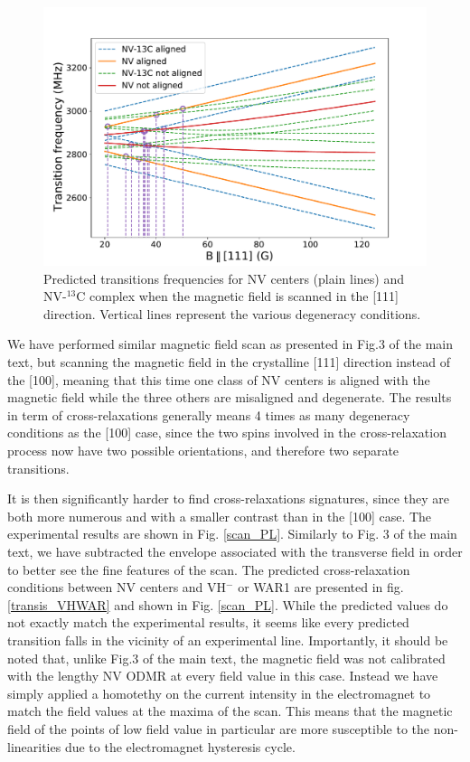 \documentclass[9pt,twocolumn,twoside]{revtex4-1}
\begin{document}
\begin{figure}

\includegraphics[width=\linewidth]{Transis_111_13C}
\caption{Predicted transitions frequencies for NV centers (plain lines) and NV-$^{13}$C complex when the magnetic field is scanned in the [111] direction. Vertical lines represent the various degeneracy conditions.}\label{transis_13C}
\end{figure}

We have performed similar magnetic field scan as presented in Fig.3 of the main text, but scanning the magnetic field in the crystalline [111] direction instead of the [100], meaning that this time one class of NV centers is aligned with the magnetic field while the three others are misaligned and degenerate. The results in term of cross-relaxations generally means 4 times as many degeneracy conditions as the [100] case, since the two spins involved in the cross-relaxation process now have two possible orientations, and therefore two separate transitions.

It is then significantly harder to find cross-relaxations signatures, since they are both more numerous and with a smaller contrast than in the [100] case. The experimental results are shown in Fig. \ref{scan_PL}. Similarly to Fig. 3 of the main text, we have subtracted the envelope associated with the transverse field in order to better see the fine features of the scan. The predicted cross-relaxation conditions between NV centers and VH$^-$ or WAR1 are presented in fig. \ref{transis_VHWAR} and shown in Fig. \ref{scan_PL}. While the predicted values do not exactly match the experimental results, it seems like every predicted transition falls in the vicinity of an experimental line. Importantly, it should be noted that, unlike Fig.3 of the main text, the magnetic field was not calibrated with the lengthy NV ODMR at every field value in this case. Instead we have simply applied a homotethy on the current intensity in the electromagnet to match the field values at the maxima of the scan. This means that the magnetic field of the points of low field value in particular are more susceptible to the non-linearities due to the electromagnet hysteresis cycle.
\end{document}
